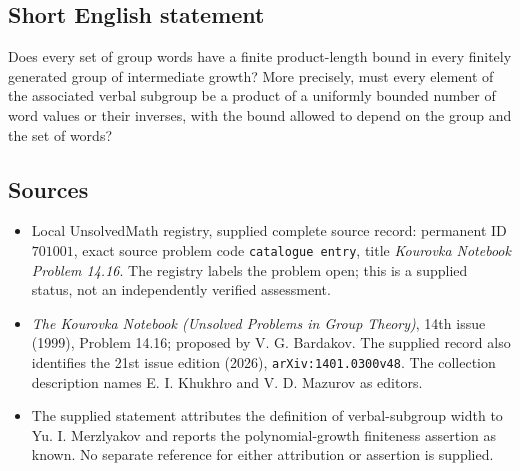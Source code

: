 \documentclass[11pt]{article}
\begin{document}
\subsection{Short English statement}
Does every set of group words have a finite product-length bound in every finitely generated group of intermediate growth? More precisely, must every element of the associated verbal subgroup be a product of a uniformly bounded number of word values or their inverses, with the bound allowed to depend on the group and the set of words?
\subsection{Sources}
\begin{itemize}
\item Local UnsolvedMath registry, supplied complete source record: permanent ID \(701001\), exact source problem code \texttt{catalogue entry}, title \emph{Kourovka Notebook Problem 14.16}. The registry labels the problem open; this is a supplied status, not an independently verified assessment.
\item \emph{The Kourovka Notebook (Unsolved Problems in Group Theory)}, 14th issue (1999), Problem 14.16; proposed by V. G. Bardakov. The supplied record also identifies the 21st issue edition (2026), \texttt{arXiv:1401.0300v48}. The collection description names E. I. Khukhro and V. D. Mazurov as editors.
\item The supplied statement attributes the definition of verbal-subgroup width to Yu. I. Merzlyakov and reports the polynomial-growth finiteness assertion as known. No separate reference for either attribution or assertion is supplied.
\end{itemize}
\end{document}
